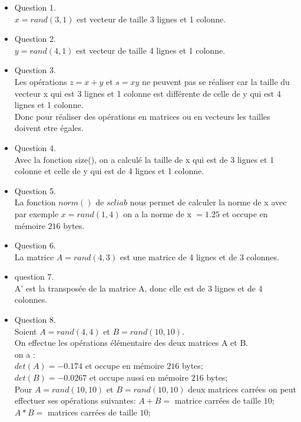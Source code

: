 \documentclass[]{article}
\begin{document}
\begin{itemize}
\item {Question 1. \\}
$ x = rand(3,1) $ est vecteur de taille 3 lignes et 1 colonne.\\
\item {Question 2. \\}
$ y = rand(4,1) $ est vecteur de taille 4 lignes et 1 colonne.\\

\item {Question 3. \\}
Les opérations $ z = x + y$ et $ s = xy$ ne peuvent pas se réaliser car la taille du vecteur x qui est 3 lignes et 1 colonne est différente de celle de y qui est 4 lignes et 1 colonne.\\
Donc pour réaliser des opérations en matrices ou en vecteurs les tailles doivent etre égales.\\

\item {Question 4. \\}
Avec la fonction size(), on a calculé la taille de x qui est de  3 lignes et 1 colonne et celle de y qui est de 4 lignes et 1 colonne.\\

\item {Question 5. \\}
La fonction $norm()$ de $scliab$ nous permet de calculer la norme de x avec par exemple $x=rand(1,4)$ on a la  norme de x $= 1.25$ et occupe en mémoire $216 $ bytes.\\

\item {Question 6. \\} 
La matrice $ A = rand(4,3) $ est une matrice de 4 lignes et de 3 colonnes.\\

\item {question 7. \\}
A' est la transposée de la matrice A, donc elle est de 3 lignes et de 4 colonnes.\\

\item {Question 8. \\}
Soient $ A = rand(4,4) $ et $ B = rand(10,10) $.\\
On effectue les opérations élémentaire des deux matrices A et B.\\
on a :\\
$ det(A) = -0.174$ et occupe en mémoire $216$ bytes;\\
$ det(B) = -0.0267$ et occupe aussi en mémoire $216$ bytes;\\
Pour $A=rand(10,10)$ et $B=rand(10,10)$ deux matrices carrées on peut effectuer ses opérations suivantes:
$A + B =$ matrice carrées de taille $10$;\\
$A*B =$ matrices carrées de taille $10$;\\


\end{itemize}
\end{document}
